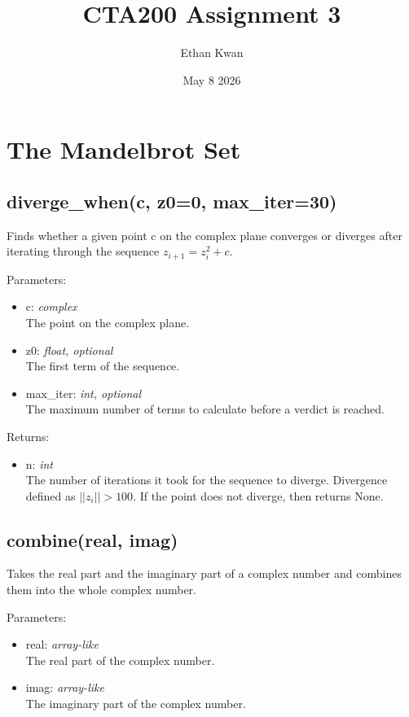 \documentclass{article}
\title{CTA200 Assignment 3}
\author{Ethan Kwan}
\date{May 8 2026}
\begin{document}
\maketitle

\section{The Mandelbrot Set}
\subsection{diverge\_when(c, z0=0, max\_iter=30)}
Finds whether a given point c on the complex plane converges or diverges after iterating through the sequence $z_{i+1} = z_{i}^2 + c$.

Parameters:
\begin{itemize}
    \item c: \textit{complex} \\
    The point on the complex plane.
    \item z0: \textit{float, optional} \\
    The first term of the sequence.
    \item max\_iter: \textit{int, optional} \\
    The maximum number of terms to calculate before a verdict is reached.
\end{itemize}

Returns:
\begin{itemize}
    \item n: \textit{int} \\
    The number of iterations it took for the sequence to diverge. Divergence defined as $||z_i|| > 100$. If the point does not diverge, then returns None.
\end{itemize}
\subsection{combine(real, imag)}
Takes the real part and the imaginary part of a complex number and combines them into the whole complex number.

Parameters:
\begin{itemize}
    \item real: \textit{array-like} \\
    The real part of the complex number.
    \item imag: \textit{array-like} \\
    The imaginary part of the complex number.
\end{itemize}
\end{document}
